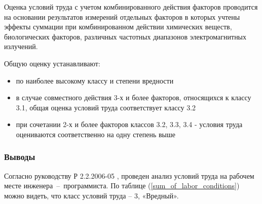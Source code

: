 Оценка условий труда с учетом комбинированного действия факторов проводится на
основании результатов измерений отдельных факторов в которых учтены эффекты
суммации при комбинированном действии химических веществ, биологических факторов,
различных частотных диапазонов электромагнитных излучений.

Общую оценку устанавливают:

\begin{itemize}
    \item   по наиболее высокому классу и степени вредности
    \item   в случае совместного действия 3-х и более факторов, относящихся к классу
            3.1, общая оценка условий труда соответствует классу 3.2
    \item   при сочетании 2-х и более факторов классов 3.2, 3.3, 3.4 - условия
            труда оцениваются соответственно на одну степень выше
\end{itemize}



\subsubsection{Выводы}

Согласно руководству Р 2.2.2006-05 \cite{ecology_man_2_2_2006_05}, проведен анализ
условий труда на рабочем месте инженера~--~программиста. По таблице
(\ref{sum_of_labor_conditions}) можно видеть, что класс условий труда – 3, «Вредный».
